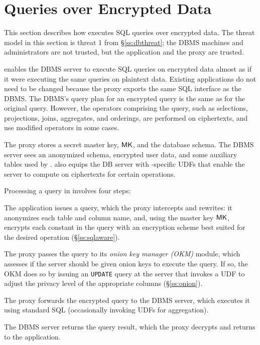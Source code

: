 
\section{Queries over Encrypted Data}
\label{s:design}


This section describes how \name{} executes SQL queries over encrypted
data.  The threat model in this section is threat 1 from
\S\ref{ss:dbthreat}; the DBMS machines and administrators are not
trusted, but the application and the proxy are trusted.

\name{} enables the DBMS server to execute SQL queries on encrypted
data almost as if it were executing the same queries on plaintext
data. Existing applications do not need to be changed because the
proxy exports the same SQL interface as the DBMS\@. The DBMS's query
plan for an encrypted query is the same as for the original query.
However, the operators comprising the query, such as selections,
projections, joins, aggregates, and orderings, are performed on
ciphertexts, and use modified operators in some cases.

The \name{} proxy stores a secret master key, $\mathsf{MK}$, and the database
schema.  The DBMS server sees an anonymized schema, encrypted user
data, and some auxiliary tables used by \name{}.  \name{} also equips
the DB server with \name{}-specific UDFs that enable the server to
compute on ciphertexts for certain operations.

Processing a query in \name{} involves four steps:
\begin{CompactEnumerate}
\item The application issues a query, which the proxy intercepts and
  rewrites: it anonymizes each table and column name, and, using the
  master key $\mathsf{MK}$, encrypts each constant in the query with an
  encryption scheme best suited for the desired operation
  (\S\ref{ss:sqlaware}).
\item The proxy passes the query to its {\em onion key manager (OKM)}
  module, which assesses if the server should be given onion keys to
  execute the query. If so, the OKM does so by issuing an
  \texttt{UPDATE} query at the server that invokes a UDF to adjust the
  privacy level of the appropriate columns (\S\ref{ss:onion}).
\item The proxy forwards the encrypted query to the DBMS server,
  which executes it using standard SQL (occasionally invoking 
  UDFs for aggregation).
\item The DBMS server returns the query result, which the proxy
  decrypts and returns to the application.
\end{CompactEnumerate}

